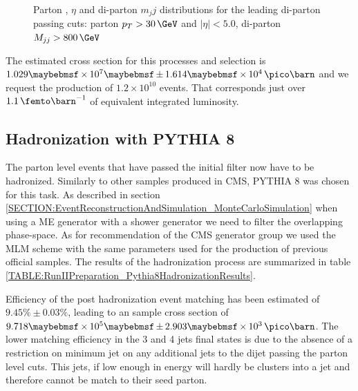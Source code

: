 \begin{figure}[!htp]
\caption[Key variables of events passing the parton level filter]{Parton \pt, $\eta$ and di-parton $m_jj$ distributions for the leading di-parton passing cuts: parton $p_{T}>30\,\GeV$ and $|\eta|<5.0$, di-parton $M_{jj}>800\,\GeV$}
\label{FIGURE:RunIIPreparation_PassPartonFilterDistributions}
\end{figure}

The estimated cross section for this processes and selection is $1.029 \times 10^7 \pm 1.614 \times 10^4 \,\pico\barn$ and we request the production of $1.2 \times 10^{10}$ events. That corresponds just over $1.1\,\femto\barn^{-1}$ of equivalent integrated luminosity. 

\subsection{Hadronization with \textsc{PYTHIA 8}}
\label{SUBSECTION:RunIIPreparation_HadronizationWithPythia8}


The parton level events that have passed the initial filter now have to be hadronized. Similarly to other samples produced in \gls{CMS}, \textsc{PYTHIA 8} was chosen for this task. As described in section \ref{SECTION:EventReconstructionAndSimulation_MonteCarloSimulation} when using a \gls{ME} generator with a shower generator we need to filter the overlapping phase-space. As for recommendation of the \gls{CMS} generator group we used the MLM scheme with the same parameters used for the production of previous official samples. The results of the hadronization process are summarized in table \ref{TABLE:RunIIPreparation_Pythia8HadronizationResults}.



Efficiency of the post hadronization event matching has been estimated of $9.45\% \pm 0.03\%$, leading to an sample cross section of $9.718 \times 10^5 \pm 2.903 \times 10^3\,\pico\barn$. The lower matching efficiency in the 3 and 4 jets final states is due to the absence of a restriction on minimum jet \pt on any additional jets to the dijet passing the parton level cuts. This jets, if low enough in energy will hardly be clusters into a jet and therefore cannot be match to their seed parton.

